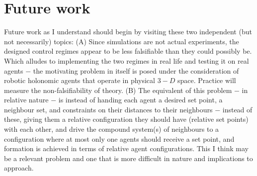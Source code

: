 \chapter{Future work}

Future work as I understand should begin by visiting these two independent (but
not necessarily) topics:
(A) Since simulations are not actual experiments, the designed control regimes
appear to be less falsifiable than they could possibly be. Which alludes to
implementing the two regimes in real life and testing it on real agents $-$ the
motivating problem in itself is posed under the consideration of robotic
holonomic agents that operate in physical $3-D$ space. Practice will measure the
non-falsifiability of theory.
(B) The equivalent of this problem $-$ in relative nature $-$ is instead of
handing each agent a desired set point, a neighbour set, and constraints on
their distances to their neighbours $-$ instead of these, giving them a
relative configuration they should have (relative set points) with each other,
and drive the compound system(s) of neighbours to a configuration where at most
only one agents should receive a set point, and formation is achieved in
terms of relative agent configurations. This I think may be a relevant problem
and one that is more difficult in nature and implications to approach.
